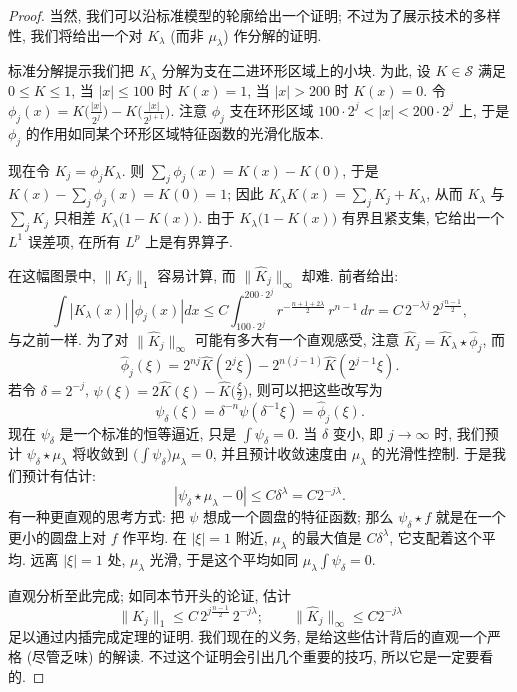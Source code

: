\begin{proof}
当然, 我们可以沿标准模型的轮廓给出一个证明; 不过为了展示技术的多样性, 我们将给出一个对 $K_{\lambda}$ (而非 $\mu_{\lambda}$) 作分解的证明.

标准分解提示我们把 $K_\lambda$ 分解为支在二进环形区域上的小块. 为此, 设 $K\in\mathcal{S}$ 满足 $0\leq K\leq 1$, 当 $|x|\leq 100$ 时 $K(x)=1$, 当 $|x|>200$ 时 $K(x)=0$. 令 $\phi_j(x)=K\bigl(\frac{|x|}{2^j}\bigr)-K\bigl(\frac{|x|}{2^{j+1}}\bigr)$. 注意 $\phi_j$ 支在环形区域 $100\cdot 2^j<|x|<200\cdot 2^j$ 上, 于是 $\phi_j$ 的作用如同某个环形区域特征函数的光滑化版本.

现在令 $K_j=\phi_jK_\lambda$. 则 $\sum_j\phi_j(x)=K(x)-K(0)$, 于是 $K(x)-\sum_j\phi_j(x)=K(0)=1$; 因此 $K_\lambda K(x)=\sum_jK_j+K_\lambda$, 从而 $K_\lambda$ 与 $\sum_jK_j$ 只相差 $K_\lambda\bigl(1-K(x)\bigr)$. 由于 $K_\lambda\bigl(1-K(x)\bigr)$ 有界且紧支集, 它给出一个 $L^1$ 误差项, 在所有 $L^p$ 上是有界算子.

在这幅图景中, $\|K_j\|_1$ 容易计算, 而 $\|\hat{K}_j\|_\infty$ 却难. 前者给出:
\[
\int\left|K_{\lambda}(x)\right|\,\left|\phi_{j}(x)\right|dx
\leq C\int_{100\cdot 2^{j}}^{200\cdot 2^{j}}r^{-\frac{n+1+2\lambda}{2}}\,r^{n-1}\,dr
=C\,2^{-\lambda j}\,2^{j\frac{n-1}{2}},
\]
与之前一样. 为了对 $\|\hat{K}_j\|_\infty$ 可能有多大有一个直观感受, 注意 $\hat{K}_j=\hat{K}_\lambda\star\hat{\phi}_j$, 而
\[
\hat{\phi}_{j}(\xi)=2^{nj}\hat{K}(2^{j}\xi)-2^{n(j-1)}\hat{K}(2^{j-1}\xi).
\]
若令 $\delta=2^{-j}$, $\psi(\xi)=2\hat{K}(\xi)-\hat{K}\bigl(\frac{\xi}{2}\bigr)$, 则可以把这些改写为
\[
\psi_{\delta}(\xi)=\delta^{-n}\psi(\delta^{-1}\xi)=\hat{\phi}_{j}(\xi).
\]
现在 $\psi_\delta$ 是一个标准的恒等逼近, 只是 $\int\psi_\delta=0$. 当 $\delta$ 变小, 即 $j\to\infty$ 时, 我们预计 $\psi_\delta\star\mu_\lambda$ 将收敛到 $\bigl(\int\psi_\delta\bigr)\mu_\lambda=0$, 并且预计收敛速度由 $\mu_\lambda$ 的光滑性控制. 于是我们预计有估计:
\[
|\psi_{\delta}\star\mu_{\lambda}-0|\leq C\delta^{\lambda}=C2^{-j\lambda}.
\]
有一种更直观的思考方式: 把 $\psi$ 想成一个圆盘的特征函数; 那么 $\psi_{\delta}\star f$ 就是在一个更小的圆盘上对 $f$ 作平均. 在 $|\xi|=1$ 附近, $\mu_{\lambda}$ 的最大值是 $C\delta^{\lambda}$, 它支配着这个平均. 远离 $|\xi|=1$ 处, $\mu_{\lambda}$ 光滑, 于是这个平均如同 $\mu_{\lambda}\int\psi_{\delta}=0$.

直观分析至此完成; 如同本节开头的论证, 估计
\[
\|K_{j}\|_{1}\leq C\,2^{j\frac{n-1}{2}}\,2^{-j\lambda};\qquad
\|\hat{K}_{j}\|_{\infty}\leq C2^{-j\lambda}
\]
足以通过内插完成定理的证明. 我们现在的义务, 是给这些估计背后的直观一个严格 (尽管乏味) 的解读. 不过这个证明会引出几个重要的技巧, 所以它是一定要看的.


\end{proof}

